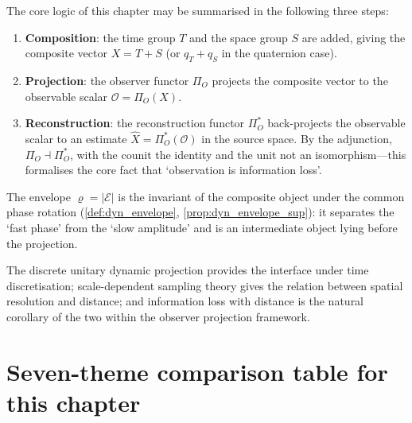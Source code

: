 \begin{remark}\label{rem:dyn_unified_logic}
The core logic of this chapter may be summarised in the following three steps:
\begin{enumerate}[label=(\arabic*)]
    \item \textbf{Composition}: the time group $T$ and the space group $S$ are added, giving the composite vector $X=T+S$ (or $q_T+q_S$ in the quaternion case).
    \item \textbf{Projection}: the observer functor $\Pi_O$ projects the composite vector to the observable scalar $\mathcal O=\Pi_O(X)$.
    \item \textbf{Reconstruction}: the reconstruction functor $\Pi_O^\ast$ back-projects the observable scalar to an estimate $\widehat X=\Pi_O^\ast(\mathcal O)$ in the source space. By the adjunction, $\Pi_O\dashv\Pi_O^\ast$, with the counit the identity and the unit not an isomorphism---this formalises the core fact that `observation is information loss'.
\end{enumerate}
The envelope $\varrho=|\mathcal E|$ is the invariant of the composite object under the common phase rotation (\cref{def:dyn_envelope}, \cref{prop:dyn_envelope_sup}): it separates the `fast phase' from the `slow amplitude' and is an intermediate object lying before the projection.

The discrete unitary dynamic projection provides the interface under time discretisation; scale-dependent sampling theory gives the relation between spatial resolution and distance; and information loss with distance is the natural corollary of the two within the observer projection framework.
\end{remark}

\section*{Seven-theme comparison table for this chapter}

